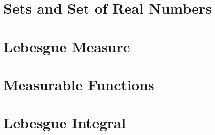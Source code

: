 \documentclass{report}
\begin{document}
	
	\thispagestyle{empty}
	\newpage%
	\tableofcontents
  
  \chapter{Sets and Set of Real Numbers}
  
  \chapter{Lebesgue Measure}
  
  \chapter{Measurable Functions}
  
  \chapter{Lebesgue Integral}
  
  
\end{document}
